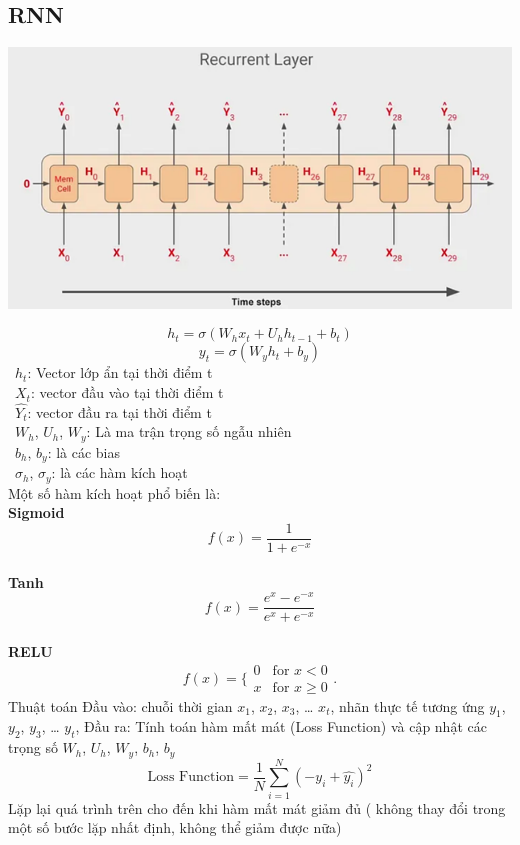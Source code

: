 \subsection{RNN}
\begin{minipage}{0.45\textwidth}
\centering
\includegraphics[width=1\textwidth]{resources/chapter-4/rnn-1.png}
\end{minipage}
\[h_t = \sigma (W_{h}x_{t} + U_h h_{t-1} + b_t) \]
\[y_t = \sigma (W_{y} h_t + b_y)\]
    \indent\textbullet\ \(h_t\): Vector lớp ẩn tại thời điểm t\\
    \indent\textbullet\ \(X_t\): vector đầu vào tại thời điểm t\\
    \indent\textbullet\ \(\widehat{Y_t}\): vector đầu ra tại thời điểm t\\
    \indent\textbullet\ \(W_h\), \(U_h\), \(W_y\): Là ma trận trọng số ngẫu nhiên\\
    \indent\textbullet\ \(b_h\), \(b_y\): là các bias\\
    \indent\textbullet\ \(\sigma_h\), \(\sigma_y\): là các hàm kích hoạt\\

Một số hàm kích hoạt phổ biến là:
\\ \textbf{Sigmoid}
\[f(x)=\frac{1}{1+e^{-x}}\]
\\ \textbf{Tanh}
\[f(x) = \frac{e^x - e^{-x}}{e^x + e^{-x}}\]
\\ \textbf{RELU}
\[f(x)=\{\begin{matrix}
0 & \text{for } x<0 \\
x & \text{for } x\ge0
\end{matrix}.\]
Thuật toán
Đầu vào: chuỗi thời gian \(x_1\), \(x_2\), \(x_3\), … \(x_t\), nhãn thực tế tương ứng \(y_1\), \(y_2\), \(y_3\), … \(y_t\),
Đầu ra: Tính toán hàm mất mát (Loss Function) và cập nhật các trọng số \(W_h\), \(U_h\), \(W_y\), \(b_h\), \(b_y\)
\[\text{Loss Function} = \frac{1}{N} \sum_{i=1}^{N} (-y_i + \hat{y_i})^2\]
Lặp lại quá trình trên cho đến khi hàm mất mát giảm đủ ( không thay đổi trong một số bước lặp nhất định, không thể giảm được nữa)
